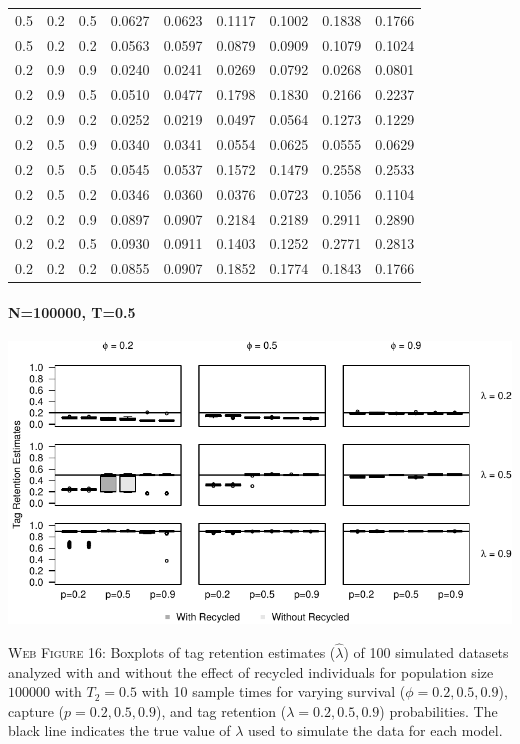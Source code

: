 \documentclass[]{article}
\let\oldparagraph\paragraph
\renewcommand{\paragraph}[1]{\oldparagraph{#1}\mbox{}}
\begin{document}
\begin{table}[ht]
{\begin{tabular}{rrrrrrrrr}
  0.5 & 0.2 & 0.5 & 0.0627 & 0.0623 & 0.1117 & 0.1002 & 0.1838 & 0.1766 \\ 
  0.5 & 0.2 & 0.2 & 0.0563 & 0.0597 & 0.0879 & 0.0909 & 0.1079 & 0.1024 \\ 
  0.2 & 0.9 & 0.9 & 0.0240 & 0.0241 & 0.0269 & 0.0792 & 0.0268 & 0.0801 \\ 
  0.2 & 0.9 & 0.5 & 0.0510 & 0.0477 & 0.1798 & 0.1830 & 0.2166 & 0.2237 \\ 
  0.2 & 0.9 & 0.2 & 0.0252 & 0.0219 & 0.0497 & 0.0564 & 0.1273 & 0.1229 \\ 
  0.2 & 0.5 & 0.9 & 0.0340 & 0.0341 & 0.0554 & 0.0625 & 0.0555 & 0.0629 \\ 
  0.2 & 0.5 & 0.5 & 0.0545 & 0.0537 & 0.1572 & 0.1479 & 0.2558 & 0.2533 \\ 
  0.2 & 0.5 & 0.2 & 0.0346 & 0.0360 & 0.0376 & 0.0723 & 0.1056 & 0.1104 \\ 
  0.2 & 0.2 & 0.9 & 0.0897 & 0.0907 & 0.2184 & 0.2189 & 0.2911 & 0.2890 \\ 
  0.2 & 0.2 & 0.5 & 0.0930 & 0.0911 & 0.1403 & 0.1252 & 0.2771 & 0.2813 \\ 
  0.2 & 0.2 & 0.2 & 0.0855 & 0.0907 & 0.1852 & 0.1774 & 0.1843 & 0.1766 \\ 
   \hline
\end{tabular}
}
\endgroup
\end{table}

\newpage

\paragraph{N=100000, T=0.5}\label{n100000-t0.5-2}

\includegraphics{Appendix_BW_files/figure-latex/figure16_tagretention_GJSTL3-1.pdf}

\textsc{Web Figure 16:} Boxplots of tag retention estimates
(\(\hat{\lambda}\)) of 100 simulated datasets analyzed with and without
the effect of recycled individuals for population size \(100000\) with
\(T_2=0.5\) with 10 sample times for varying survival
(\(\phi=0.2,0.5,0.9\)), capture (\(p=0.2,0.5,0.9\)), and tag retention
(\(\lambda=0.2,0.5,0.9\)) probabilities. The black line indicates the
true value of \(\lambda\) used to simulate the data for each model.
\end{document}
